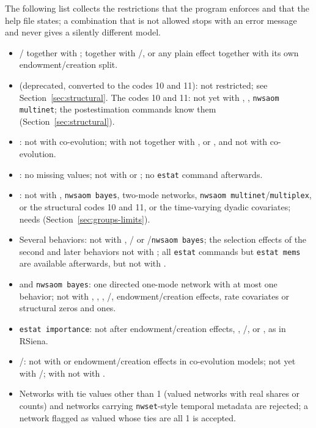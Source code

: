 The following list collects the restrictions that the program enforces and that the help file states; a combination that is not allowed stops with an error message and never gives a silently different model.
\begin{itemize}[nosep]
  \item {\sloppy {}/ together with ;  together with /, or any plain effect together with its own endowment/creation split.\par}
  \item {} (deprecated, converted to the codes 10 and 11): not restricted; see Section~\ref{sec:structural}. The codes 10 and 11: not yet with , , \texttt{nwsaom multinet}; the postestimation commands know them (Section~\ref{sec:structural}).
  \item {}: not with co-evolution; with  not together with ,  or , and not with co-evolution.
  \item {}: no missing values; not with  or ; no \texttt{estat} command afterwards.
  \item {}: not with , \texttt{nwsaom bayes}, two-mode networks, \texttt{nwsaom multinet}/\texttt{multiplex},  or the structural codes 10 and 11, or the time-varying dyadic covariates;  needs  (Section~\ref{sec:groups-limits}).
  \item Several behaviors: not with , / or /\texttt{nwsaom bayes}; the selection effects of the second and later behaviors not with ; all \texttt{estat} commands but \texttt{estat mems} are available afterwards, but not with .
  \item {} and \texttt{nwsaom bayes}: one directed one-mode network with at most one behavior; not with , , , /, endowment/creation effects, rate covariates or structural zeros and ones.
  \item {\sloppy \texttt{estat importance}: not after endowment/creation effects, , /,  or , as in RSiena.\par}
  \item {}/: not with  or endowment/creation effects in co-evolution models; not yet with /; with  not with .
  \item Networks with tie values other than 1 (valued networks with real shares or counts) and networks carrying \texttt{nwset}-style temporal metadata are rejected; a network flagged as valued whose ties are all 1 is accepted.
\end{itemize}
